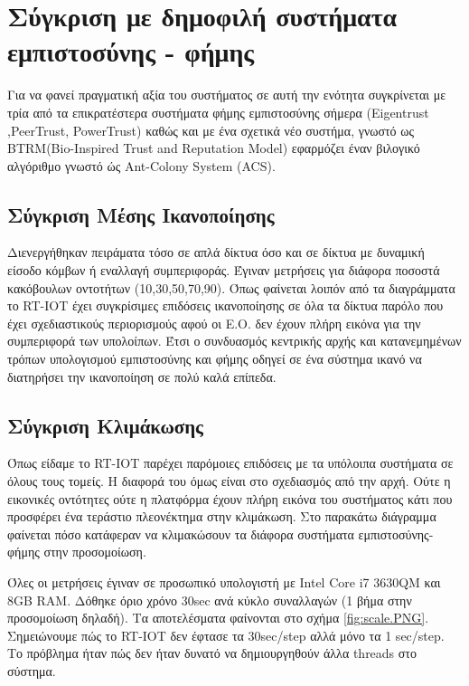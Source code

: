 \section{Σύγκριση με δημοφιλή συστήματα εμπιστοσύνης - φήμης}
Για να φανεί  πραγματική αξία του συστήματος σε αυτή την ενότητα
συγκρίνεται με τρία από τα επικρατέστερα συστήματα φήμης εμπιστοσύνης σήμερα (Eigentrust \cite{EigenTrust},PeerTrust\cite{PeerTrust},  PowerTrust\cite{PowerTrust}) 
 καθώς και με ένα σχετικά νέο συστήμα, γνωστό ως BTRM(Bio-Inspired Trust and Reputation Model\cite{BTRM})  εφαρμόζει έναν βιλογικό αλγόριθμο γνωστό ώς Ant-Colony System\cite{Dorigo} (ACS).



\subsection{Σύγκριση Μέσης Ικανοποίησης}

Διενεργήθηκαν πειράματα τόσο σε απλά δίκτυα όσο και σε δίκτυα με δυναμική είσοδο κόμβων ή εναλλαγή συμπεριφοράς. Έγιναν μετρήσεις για διάφορα ποσοστά κακόβουλων οντοτήτων (10,30,50,70,90).
\newpage
Όπως φαίνεται λοιπόν από τα διαγράμματα το RT-IOT έχει συγκρίσιμες επιδόσεις ικανοποίησης σε όλα τα δίκτυα παρόλο που έχει σχεδιαστικούς περιορισμούς αφού οι Ε.Ο. δεν έχουν πλήρη εικόνα για την συμπεριφορά των υπολοίπων. Έτσι ο συνδυασμός κεντρικής αρχής και κατανεμημένων τρόπων υπολογισμού εμπιστοσύνης και φήμης οδηγεί σε ένα σύστημα ικανό να διατηρήσει την ικανοποίηση σε πολύ καλά επίπεδα.

\newpage
\subsection{Σύγκριση Κλιμάκωσης}

Όπως είδαμε το RT-IOT παρέχει παρόμοιες επιδόσεις με τα υπόλοιπα συστήματα σε όλους τους τομείς. Η διαφορά του όμως είναι στο σχεδιασμός από την αρχή. Ούτε η εικονικές οντότητες ούτε η πλατφόρμα έχουν πλήρη εικόνα του συστήματος κάτι που προσφέρει ένα τεράστιο πλεονέκτημα στην κλιμάκωση. Στο παρακάτω διάγραμμα φαίνεται πόσο κατάφεραν να κλιμακώσουν τα διάφορα συστήματα εμπιστοσύνης-φήμης στην προσομοίωση.


Όλες οι μετρήσεις έγιναν σε προσωπικό υπολογιστή με Intel Core i7 3630QM και 8GB RAM. Δόθηκε όριο χρόνο 30sec ανά κύκλο συναλλαγών (1 βήμα στην προσομοίωση δηλαδή). Τα αποτελέσματα φαίνονται στο σχήμα \ref{fig:scale.PNG}. Σημειώνουμε πώς το RT-IOT δεν έφτασε τα 30sec/step αλλά μόνο τα 1 sec/step. Το πρόβλημα ήταν πώς δεν ήταν δυνατό να δημιουργηθούν άλλα threads στο σύστημα.

